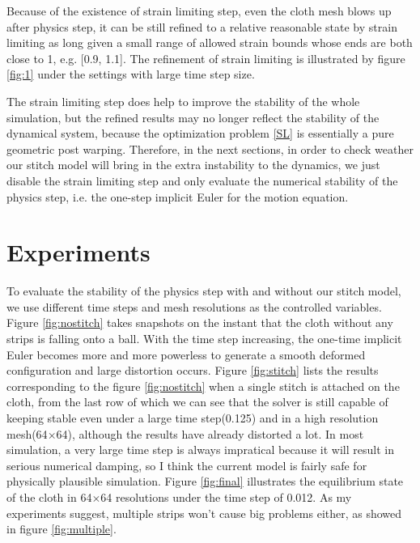 \documentclass[a4paper,10pt]{article}
\begin{document}
Because of the existence of strain limiting step, even the cloth mesh blows up after physics step,  it can be still refined to a relative reasonable
state by strain limiting as long given a small range of allowed strain bounds whose ends are both close to 1, e.g. [0.9, 1.1].  The refinement of strain limiting is illustrated by figure \ref{fig:1}
under the settings with large time step size.

The strain limiting step does help to improve the stability of the whole simulation, but the refined results may no longer reflect the stability of the dynamical system, 
because the optimization problem \eqref{SL}  is essentially a pure geometric post warping. Therefore, in the next sections, in order to check weather 
our stitch model will bring in the extra instability to the dynamics, we just disable the strain limiting step and only evaluate the numerical stability
of the physics step, i.e. the one-step implicit Euler for the motion equation.

\section{Experiments}
To evaluate the stability of the physics step with and without our stitch model, we use different time steps 
and mesh resolutions as the controlled variables. Figure \ref{fig:nostitch} takes snapshots on the instant that the cloth
without any strips is falling onto a ball. With the time step increasing, the one-time implicit Euler becomes more and more powerless
to generate a smooth deformed configuration and large distortion occurs. Figure \ref{fig:stitch} lists the results corresponding to 
the figure \ref{fig:nostitch} when a single stitch is attached on the cloth, from the last row of which we can see that the solver is still capable of keeping stable even under 
a large time step(0.125) and in a high resolution mesh(64$\times$64), although the results have already distorted a lot. In most simulation, a very large time step
is always impratical because it will result in serious numerical damping, so I think the current model is fairly safe for physically plausible simulation. Figure \ref{fig:final} illustrates the equilibrium state
of the cloth in 64$\times$64 resolutions under the time step of 0.012. As my experiments suggest, multiple strips won't cause big problems either, as showed in figure \ref{fig:multiple}.
\end{document}

